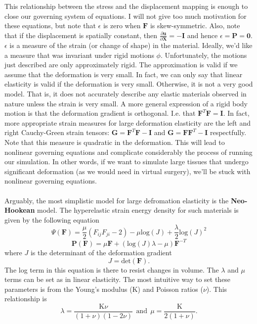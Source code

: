 \documentclass[article]{pcms-l}
\begin{document}
This relationship between the stress and the displacement mapping is enough to close our governing system of equations. I will not give too much motivation for these equations, but note that $\epsilon$ is zero when $\mathbf{F}$ is skew-symmetric. Also, note that if the displacement is spatially constant, then $\frac{\partial\mathbf{u}}{\partial\mathbf{X}}=-\mathbf{I}$ and hence $\epsilon=\mathbf{P}=\mathbf{0}$. $\epsilon$ is a measure of the strain (or change of shape) in the material. Ideally, we'd like a measure that was invariant under rigid motions $\phi$. Unfortunately, the motions just described are only approximately rigid. The approximation is valid if we assume that the deformation is very small. In fact, we can only say that linear elasticity is valid if the deformation is very small. Otherwise, it is not a very good model. That is, it does not accurately describe any elastic materials observed in nature unless the strain is very small. A more general expression of a rigid body motion is that the deformation gradient is orthogonal. I.e. that $\mathbf{F}^T\mathbf{F}=\mathbf{I}$. In fact, more appropriate strain measures for large deformation elasticity are the left and right Cauchy-Green strain tensors: $\mathbf{G}=\mathbf{F}^T\mathbf{F}-\mathbf{I}$ and  $\mathbf{G}=\mathbf{F}\mathbf{F}^T-\mathbf{I}$ respectfully. Note that this measure is quadratic in the deformation. This will lead to nonlinear governing equations and complicate considerably the process of running our simulation. In other words, if we want to simulate large tissues that undergo significant deformation (as we would need in virtual surgery), we'll be stuck with nonlinear governing equations.\\
\\
Arguably, the most simplistic model for large defromation elasticity is the {\bf Neo-Hookean} model. The hyperelastic strain energy density for such materials is given by the following equation
$$
\Psi(\mathbf{F})=\frac{\mu}{2}\left(F_{ij}F_{ji}-2\right)-\mu\textrm{log}(J)+\frac{\lambda}{2}\textrm{log}(J)^2
$$
$$
\mathbf{P}(\mathbf{F})=\mu\mathbf{F}+(\textrm{log}(J)\lambda-\mu)\mathbf{F}^{-T}
$$
where  $J$ is the determinant of the deformation gradient
$$
J=\textrm{det}(\mathbf{F}).
$$
The log term in this equation is there to resist changes in volume. The $\lambda$ and $\mu$ terms can be set as in linear elasticity. The most intuitive way to set these parameters is from the Young's modulus ($\textrm{K}$) and Poisson ratios ($\nu$). This relationship is
$$
\lambda=\frac{\textrm{K}\nu}{(1+\nu)(1-2\nu)} \ \ \textrm{and} \ \ \mu=\frac{\textrm{K}}{2(1+\nu)}.
$$
\end{document}

